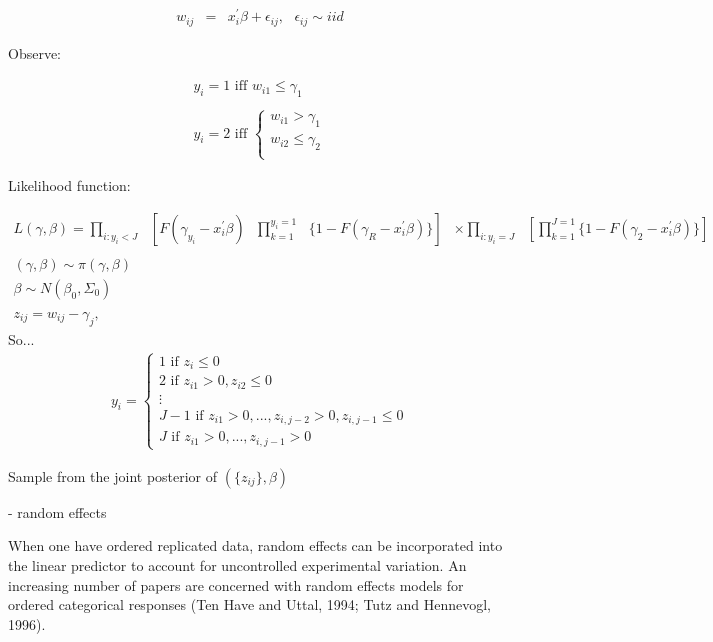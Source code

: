\begin{eqnarray}
	w_{ij} &=& x_{i}^{'}\beta+\epsilon_{ij},\text{ }\epsilon_{ij} \sim iid \nonumber
\end{eqnarray}

Observe:

\begin{eqnarray}
	y_{i} = 1\text{ iff } w_{i1} \leq \gamma_{1} \nonumber \\
	\nonumber \\
	y_{i} = 2\text{ iff }
	\begin{cases}
	w_{i1} > \gamma_{1} \nonumber \\
	w_{i2} \leq \gamma_{2} \nonumber \\
\end{cases}
\end{eqnarray}

Likelihood function:

\begin{eqnarray}
	L(\gamma,\beta) = \prod_{i\colon y_{i}<J}\text{ }[ F(\gamma_{y_{i}} - x_{i}^{'}\beta)\text{ }\prod_{k=1}^{y_{i}=1}\text{ }\{1-F(\gamma_{R}-x_{i}^{'}\beta)\}] &\times \displaystyle \prod_{i\colon y_{i}=J}\text{ }[\prod_{k=1}^{J=1} \{1-F(\gamma_{2} - x_{i}^{'}\beta)\}] \nonumber \\
	\nonumber \\
	(\gamma,\beta) \sim \pi (\gamma,\beta) & \nonumber \\
	\beta \sim N(\beta_{0},\Sigma_{0}) & \nonumber \\
	\nonumber \\
	z_{ij} = w_{ij} - \gamma_{j}, & \nonumber
	\end{eqnarray}
	So...
	\begin{eqnarray}
	y_{i} =
	\begin{cases}
	1\text{ if }z_{i} \leq 0 \nonumber \\
	2\text{ if }z_{i1} > 0, z_{i2} \leq 0 \nonumber \\
	\vdots \nonumber \\
	J-1\text{ if }z_{i1} > 0,...,z_{i,j-2}>0,z_{i,j-1}\leq0 \nonumber \\
	J\text{ if }z_{i1}>0,...,z_{i,j-1}>0
\end{cases}
\end{eqnarray}

Sample from the joint posterior of $(\{z_{ij}\},\beta)$

- random effects

When one have ordered replicated data, random effects can be incorporated into the linear predictor
to account for uncontrolled experimental variation. An increasing number of papers are concerned
with random effects models for ordered categorical responses (Ten Have and Uttal, 1994; Tutz and
Hennevogl, 1996).

